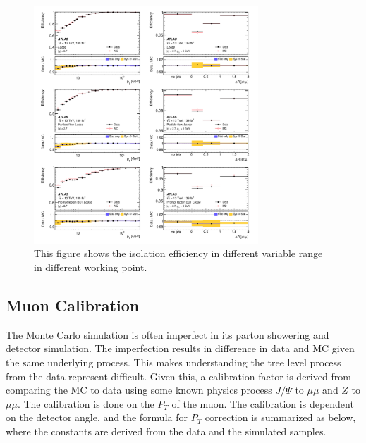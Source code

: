 
\begin{figure}[!htb]
    \begin{center}
        \includegraphics[width=0.75\textwidth]{figures/common_ana/IsolationEff1}
        \caption{
            This figure shows the isolation efficiency in different variable range in different working point\cite{Aad:2746302}.
        }
        \label{fig:isolationWP}
    \end{center}
\end{figure}


\subsection{Muon Calibration}
The Monte Carlo simulation is often imperfect in its parton showering and detector simulation. The imperfection results in difference in data and MC given the same underlying process. This makes understanding the tree level process from the data represent difficult. Given this, a calibration factor is derived from comparing the MC to data using some known physics process $J/\Psi$ to $\mu \mu$ and $Z$ to $\mu \mu$. The calibration is done on the $P_{T}$ of the muon. 
The calibration is dependent on the detector angle, and the formula for $P_{T}$ correction is summarized as below, where the constants are derived from the data and the simulated samples.

